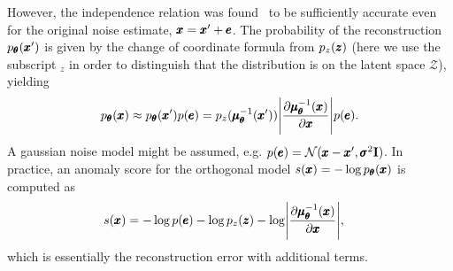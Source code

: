 However, the independence relation was found~\cite{vsmidl2019anomaly} to be sufficiently accurate even for the original noise estimate, $\pmb{{x}}=\pmb{{x}}'+\pmb{{e}}$.  The  probability of the reconstruction $p_{\pmb{{\theta}}}(\pmb{{x}}')$ is given by the change of coordinate formula from $p_{z}(\pmb{{z}})$ (here we use the subscript $_z$ in order to distinguish that the distribution is on the latent space $\mathcal{Z}$), yielding
\begin{align}
p_{\vc{\theta}}(\vc{x})\approx p_{\vc{\theta}}(\vc{x}')p(\vc{e})=p_{z}(\vc{\mu}_{\vc{\theta}}^{-1}(\vc{x}'))\left\vert \frac{\partial \vc{\mu}_{\vc{\theta}}^{-1}(\vc{x})}{\partial \vc{x}}\right\vert p(\vc{e}).\label{eq:pxjacodeco}
\end{align}
A gaussian noise model might be assumed, e.g. $p(\pmb{{e}}) = \mathcal{N}(\pmb{{x}}-\pmb{{x}}',\pmb{{\sigma}}^{2}\mathbf{I})$. In practice, an anomaly score for the orthogonal model $s(\pmb{{x}}) = - \log p_{\pmb{{\theta}}}(\pmb{{x}})$ is computed as
\begin{align}
s(\vc{x}) & = - \log p(\vc{e}) -\log p_{z}(\vc{z})-\log\left\vert \frac{\partial \vc{\mu}_{\vc{\theta}}^{-1}(\vc{x})}{\partial \vc{x}}\right\vert ,\label{eq:jacodeco}
\end{align}
which is essentially the reconstruction error with additional terms.

